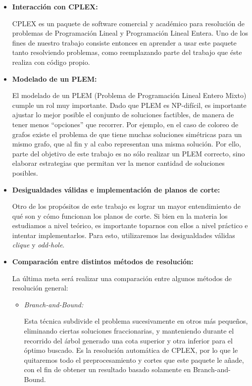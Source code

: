 \documentclass[a4paper]{article}
\begin{document}
\begin{itemize}

	\item {\bf Interacción con CPLEX:}
	
	CPLEX es un paquete de software comercial y académico para resolución de problemas de Programación Lineal y Programación Lineal Entera. Uno de los fines de nuestro trabajo consiste entonces en aprender a usar este paquete tanto resolviendo problemas, como reemplazando parte del trabajo que éste realiza con código propio.
	
	\item {\bf Modelado de un PLEM:}
	
	El modelado de un PLEM (Problema de Programación Lineal Entero Mixto) cumple un rol muy importante. Dado que PLEM es NP-difícil, es importante ajustar lo mejor posible el conjunto de soluciones factibles, de manera de tener menos ``opciones'' que recorrer.  Por ejemplo, en el caso de coloreo de grafos existe el problema de que tiene muchas soluciones simétricas para un mismo grafo, que al fin y al cabo representan una misma solución.  Por ello, parte del objetivo de este trabajo es no sólo realizar un PLEM correcto, sino elaborar estrategias que permitan ver la menor cantidad de soluciones posibles.
	
	\item {\bf Desigualdades válidas e implementación de planos de corte:}
	
	Otro de los propósitos de este trabajo es lograr un mayor entendimiento de qué son y cómo funcionan los planos de corte. Si bien en la materia los estudiamos a nivel teórico, es importante toparnos con ellos a nivel práctico e intentar implementarlos. Para esto, utilizaremos las desigualdades válidas {\it clique} y {\it odd-hole}.

	\item {\bf Comparación entre distintos métodos de resolución:}
	
	La última meta será realizar una comparación entre algunos métodos de resolución general:
	
	\begin{itemize}
	
		\item {\it Branch-and-Bound:}
		
		Esta técnica subdivide el problema sucesivamente en otros más pequeños, eliminando ciertas soluciones fraccionarias, y manteniendo durante el recorrido del árbol generado una cota superior y otra
inferior para el óptimo buscado. Es la resolución automática de CPLEX, por lo que le quitaremos todo el preprocesamiento y cortes que este paquete le añade, con el fin de obtener un resultado basado solamente en Branch-and-Bound.
		

\end{itemize}
\end{itemize}
\end{document}

